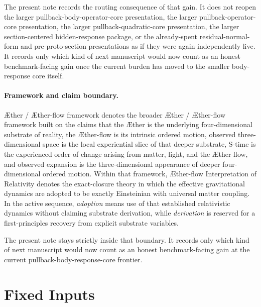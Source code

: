\documentclass[11pt]{article}
\newcommand{\Aether}{\AE{}ther}
\newcommand{\Aflow}{\AE{}ther-flow}
\newcommand{\TheoryName}{\Aflow{} Interpretation of Relativity}
\newcommand{\TheoryProgram}{\Aether{} / \Aflow{} framework}
\begin{document}
The present note records the routing consequence of that gain. It does not reopen the larger pullback-body-operator-core presentation, the larger pullback-operator-core presentation, the larger pullback-quadratic-core presentation, the larger section-centered hidden-response package, or the already-spent residual-normal-form and pre-proto-section presentations as if they were again independently live. It records only which kind of next manuscript would now count as an honest benchmark-facing gain once the current burden has moved to the smaller body-response core itself.

\paragraph{Framework and claim boundary.}
\TheoryProgram{} denotes the broader \Aether{} / \Aflow{} framework built on the claims that the \Aether{} is the underlying four-dimensional substrate of reality, the \Aflow{} is its intrinsic ordered motion, observed three-dimensional space is the local experiential slice of that deeper substrate, S-time is the experienced order of change arising from matter, light, and the \Aflow{}, and observed expansion is the three-dimensional appearance of deeper four-dimensional ordered motion. Within that framework, \TheoryName{} denotes the exact-closure theory in which the effective gravitational dynamics are adopted to be exactly Einsteinian with universal matter coupling. In the active sequence, \emph{adoption} means use of that established relativistic dynamics without claiming substrate derivation, while \emph{derivation} is reserved for a first-principles recovery from explicit substrate variables.

The present note stays strictly inside that boundary. It records only which kind of next manuscript would now count as an honest benchmark-facing gain at the current pullback-body-response-core frontier.

\section{Fixed Inputs}
\end{document}
